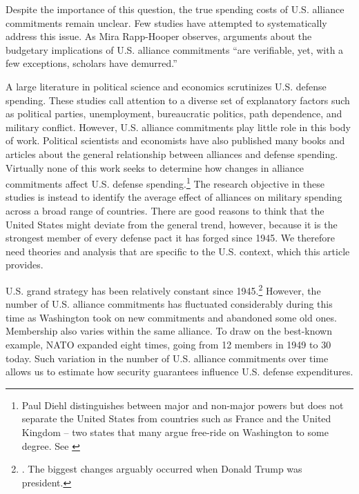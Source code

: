 Despite the importance of this question, the true spending costs of U.S. alliance commitments remain unclear. Few studies have attempted to systematically address this issue. As Mira Rapp-Hooper observes, arguments about the budgetary implications of U.S. alliance commitments ``are verifiable, yet, with a few exceptions, scholars have demurred.''\autocite[4]{rapphoopershields20} 

A large literature in political science and economics scrutinizes U.S. defense spending.\autocite[See, for example,][]{mintzpolitical92,fordhamJOP02,zielinskiSS19} These studies call attention to a diverse set of explanatory factors such as political parties, unemployment, bureaucratic politics, path dependence, and military conflict. However, U.S. alliance commitments play little role in this body of work. Political scientists and economists have also published many books and articles about the general relationship between alliances and defense spending.\autocite[See, for example,][]{OlsonZeckhauser1966,Sandler1993,Palmer1990,Fuhrmann2020} Virtually none of this work seeks to determine how changes in alliance commitments affect U.S. defense spending.\footnote{Paul Diehl distinguishes between major and non-major powers but does not separate the United States from countries such as France and the United Kingdom -- two states that many argue free-ride on Washington to some degree. See \cite{Diehl1994}} The research objective in these studies is instead to identify the average effect of alliances on military spending across a broad range of countries. There are good reasons to think that the United States might deviate from the general trend, however, because it is the strongest member of every defense pact it has forged since 1945. We therefore need theories and analysis that are specific to the U.S. context, which this article provides.

U.S. grand strategy has been relatively constant since 1945.\footnote{\cite[12]{Brooksetal2013}. The biggest changes arguably occurred when Donald Trump was president.} However, the number of U.S. alliance commitments has fluctuated considerably during this time as Washington took on new commitments and abandoned some old ones. Membership also varies within the same alliance. To draw on the best-known example, NATO expanded eight times, going from 12 members in 1949 to 30 today. Such variation in the number of U.S. alliance commitments over time allows us to estimate how security guarantees influence U.S. defense expenditures. 

